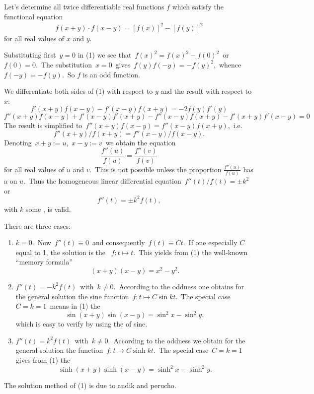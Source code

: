 \documentclass[12pt]{article}
\theoremstyle{definition}
\begin{document}
Let's determine all twice differentiable real functions $f$ which satisfy the functional equation
\begin{align}
f(x\!+\!y) \cdot f(x\!-\!y) = [f(x)]^2\!-\![f(y)]^2
\end{align}
for all real values of $x$ and $y$.

Substituting first\, $y = 0$ in (1) we see that\, $f(x)^2 = f(x)^2\!-\!f(0)^2$\, or\, $f(0) = 0$.\, The substitution\, $x = 0$\, gives\, $f(y)f(-y) = -f(y)^2$,\, whence\, $f(-y) = -f(y)$.\, So $f$ is an odd function.

We differentiate both sides of (1) with respect to $y$ and the result with respect to $x$:
     $$f'(x\!+\!y)f(x\!-\!y)\!-\!f'(x\!-\!y)f(x\!+\!y) = -2f(y)f'(y)$$
 $$f''(x\!+\!y)f(x\!-\!y)\!+\!f'(x\!-\!y)f'(x\!+\!y)\!-\! f''(x\!-\!y)f(x\!+\!y)\!-\!f'(x\!+\!y)f'(x\!-\!y) = 0$$
The result is simplified to\, $f''(x\!+\!y)f(x\!-\!y) = f''(x\!-\!y)f(x\!+\!y)$,\, i.e.                      
              $$f''(x\!+\!y)/f(x\!+\!y) = f''(x\!-\!y)/f(x\!-\!y).$$
Denoting\, $x\!+\!y := u$,\, $x\!-\!y := v$\, we obtain the equation
                     $$\frac{f''(u)}{f(u)} = \frac{f''(v)}{f(v)}$$
for all real values of $u$ and $v$.\, This is not possible unless the proportion  $\frac{f''(u)}{f(u)}$ has a  on $u$.\, Thus the  homogeneous linear differential equation\, $f''(t)/f(t) = \pm{k}^2$ or
                   $$f''(t) = \pm{k}^2f(t),$$
with $k$ some , is valid.

There are three cases:
\begin{enumerate}
  \item $k = 0$.\, Now\, $f''(t) \equiv 0$\, and consequently\, $f(t) \equiv Ct$.\, If one especially  $C$ equal to 1, the solution is the \, $f:t\mapsto{t}$.\, This yields from (1) the well-known ``memory formula''
                $$(x\!+\!y)(x\!-\!y) = x^2\!-\!y^2.$$

  \item $f''(t) = -k^2f(t)$\, with\, $k\neq 0$.\, According to the oddness one  obtains for the general solution the sine function\, $f:t\mapsto{C\sin{kt}}$.\, The special case\, $C = k = 1$\, means in (1) the 
          $$\sin(x\!+\!y)\sin(x\!-\!y) = \sin^2x-\sin^2y,$$
which is easy to verify by using the  of sine.

  \item $f''(t) = k^2f(t)$\, with\, $k\neq{0}$.\, According to the oddness we  obtain for the general solution the  function\, $f:t\mapsto{C\sinh{kt}}$.\, The special case\, $C = k = 1$\, gives from (1) the 
          $$\sinh(x\!+\!y)\sinh(x\!-\!y) = \sinh^2x-\sinh^2y.$$

\end{enumerate}

The solution method of (1) is due to andik and perucho.
\end{document}
